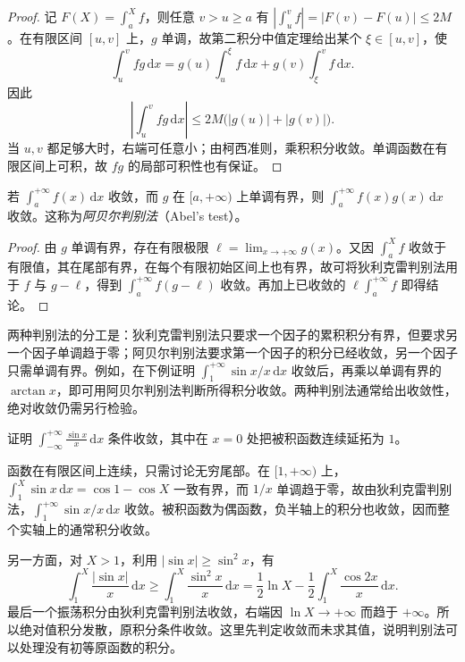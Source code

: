 \begin{proof}
记 $F(X)=\int_a^X f$，则任意 $v>u\geq a$ 有 $|\int_u^v f|=|F(v)-F(u)|\leq2M$。在有限区间 $[u,v]$ 上，$g$ 单调，故第二积分中值定理给出某个 $\xi\in[u,v]$，使
\[
    \int_u^v fg\,\mathrm{d}x
    =g(u)\int_u^\xi f\,\mathrm{d}x
     +g(v)\int_\xi^v f\,\mathrm{d}x.
\]
因此
\[
    \left|\int_u^v fg\,\mathrm{d}x\right|
    \leq2M\bigl(|g(u)|+|g(v)|\bigr).
\]
当 $u,v$ 都足够大时，右端可任意小；由柯西准则，乘积积分收敛。单调函数在有限区间上可积，故 $fg$ 的局部可积性也有保证。
\end{proof}

\begin{theorem}[阿贝尔判别法]
\label{thm:abel-test-infinite-integrals}
若 $\int_a^{+\infty}f(x)\,\mathrm{d}x$ 收敛，而 $g$ 在 $[a,+\infty)$ 上单调有界，则 $\int_a^{+\infty}f(x)g(x)\,\mathrm{d}x$ 收敛。这称为\emph{阿贝尔判别法}（Abel's test）。
\end{theorem}

\begin{proof}
由 $g$ 单调有界，存在有限极限 $\ell=\lim_{x\to+\infty}g(x)$。又因 $\int_a^Xf$ 收敛于有限值，其在尾部有界，在每个有限初始区间上也有界，故可将狄利克雷判别法用于 $f$ 与 $g-\ell$，得到 $\int_a^{+\infty}f(g-\ell)$ 收敛。再加上已收敛的 $\ell\int_a^{+\infty}f$ 即得结论。
\end{proof}

两种判别法的分工是：狄利克雷判别法只要求一个因子的累积积分有界，但要求另一个因子单调趋于零；阿贝尔判别法要求第一个因子的积分已经收敛，另一个因子只需单调有界。例如，在下例证明 $\int_1^{+\infty}\sin x/x\,\mathrm{d}x$ 收敛后，再乘以单调有界的 $\arctan x$，即可用阿贝尔判别法判断所得积分收敛。两种判别法通常给出收敛性，绝对收敛仍需另行检验。

\begin{example}
\label{ex:sinc-integral-conditional-convergence}
证明 $\int_{-\infty}^{+\infty}\frac{\sin x}{x}\,\mathrm{d}x$ 条件收敛，其中在 $x=0$ 处把被积函数连续延拓为 $1$。
\end{example}

\begin{solve}
函数在有限区间上连续，只需讨论无穷尾部。在 $[1,+\infty)$ 上，$\int_1^X\sin x\,\mathrm{d}x=\cos1-\cos X$ 一致有界，而 $1/x$ 单调趋于零，故由狄利克雷判别法，$\int_1^{+\infty}\sin x/x\,\mathrm{d}x$ 收敛。被积函数为偶函数，负半轴上的积分也收敛，因而整个实轴上的通常积分收敛。

另一方面，对 $X>1$，利用 $|\sin x|\geq\sin^2x$，有
\[
    \int_1^X\frac{|\sin x|}{x}\,\mathrm{d}x
    \geq\int_1^X\frac{\sin^2x}{x}\,\mathrm{d}x
    =\frac12\ln X-\frac12\int_1^X\frac{\cos2x}{x}\,\mathrm{d}x.
\]
最后一个振荡积分由狄利克雷判别法收敛，右端因 $\ln X\to+\infty$ 而趋于 $+\infty$。所以绝对值积分发散，原积分条件收敛。这里先判定收敛而未求其值，说明判别法可以处理没有初等原函数的积分。
\end{solve}

